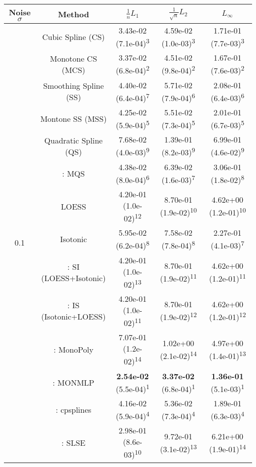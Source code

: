 \begin{tabular}{ccccc}
\toprule
Noise $\sigma$ & Method&$\frac 1n L_1$&$\frac{1}{\sqrt n}L_2$&$L_\infty$\tabularnewline
\midrule
\multirow{14}{*}{0.1}&Cubic Spline (CS)& 3.43e-02 (7.1e-04)\textsuperscript{3}& 4.59e-02 (1.0e-03)\textsuperscript{3}& 1.71e-01 (7.7e-03)\textsuperscript{3}\tabularnewline
&Monotone CS (MCS)& 3.37e-02 (6.8e-04)\textsuperscript{2}& 4.51e-02 (9.8e-04)\textsuperscript{2}& 1.67e-01 (7.6e-03)\textsuperscript{2}\tabularnewline
&Smoothing Spline (SS)& 4.40e-02 (6.4e-04)\textsuperscript{7}& 5.71e-02 (7.9e-04)\textsuperscript{6}& 2.08e-01 (6.4e-03)\textsuperscript{6}\tabularnewline
&Montone SS (MSS)& 4.25e-02 (5.9e-04)\textsuperscript{5}& 5.51e-02 (7.3e-04)\textsuperscript{5}& 2.01e-01 (6.7e-03)\textsuperscript{5}\tabularnewline
&Quadratic Spline (QS)& 7.68e-02 (4.0e-03)\textsuperscript{9}& 1.39e-01 (8.2e-03)\textsuperscript{9}& 6.99e-01 (4.6e-02)\textsuperscript{9}\tabularnewline
&\textcite{heMonotoneBsplineSmoothing1998}: MQS& 4.38e-02 (8.0e-04)\textsuperscript{6}& 6.39e-02 (1.6e-03)\textsuperscript{7}& 3.06e-01 (1.8e-02)\textsuperscript{8}\tabularnewline
&LOESS& 4.20e-01 (1.0e-02)\textsuperscript{12}& 8.70e-01 (1.9e-02)\textsuperscript{10}& 4.62e+00 (1.2e-01)\textsuperscript{10}\tabularnewline
&Isotonic& 5.95e-02 (6.2e-04)\textsuperscript{8}& 7.58e-02 (7.8e-04)\textsuperscript{8}& 2.27e-01 (4.1e-03)\textsuperscript{7}\tabularnewline
&\textcite{mammenEstimatingSmoothMonotone1991}: SI (LOESS+Isotonic)& 4.20e-01 (1.0e-02)\textsuperscript{13}& 8.70e-01 (1.9e-02)\textsuperscript{11}& 4.62e+00 (1.2e-01)\textsuperscript{11}\tabularnewline
&\textcite{mammenEstimatingSmoothMonotone1991}: IS (Isotonic+LOESS)& 4.20e-01 (1.0e-02)\textsuperscript{11}& 8.70e-01 (1.9e-02)\textsuperscript{12}& 4.62e+00 (1.2e-01)\textsuperscript{12}\tabularnewline
&\textcite{murrayFastFlexibleMethods2016a}: MonoPoly& 7.07e-01 (1.2e-02)\textsuperscript{14}& 1.02e+00 (2.1e-02)\textsuperscript{14}& 4.97e+00 (1.4e-01)\textsuperscript{13}\tabularnewline
&\textcite{cannonMonmlpMultilayerPerceptron2017}: MONMLP& \textbf{2.54e-02} (5.5e-04)\textsuperscript{1}& \textbf{3.37e-02} (6.8e-04)\textsuperscript{1}& \textbf{1.36e-01} (5.1e-03)\textsuperscript{1}\tabularnewline
&\textcite{navarro-garciaConstrainedSmoothingOutofrange2023}: cpsplines& 4.16e-02 (5.9e-04)\textsuperscript{4}& 5.36e-02 (7.3e-04)\textsuperscript{4}& 1.89e-01 (6.3e-03)\textsuperscript{4}\tabularnewline
&\textcite{groeneboomConfidenceIntervalsMonotone2023}: SLSE& 2.98e-01 (8.6e-03)\textsuperscript{10}& 9.72e-01 (3.1e-02)\textsuperscript{13}& 6.21e+00 (1.9e-01)\textsuperscript{14}\tabularnewline

\end{tabular}
